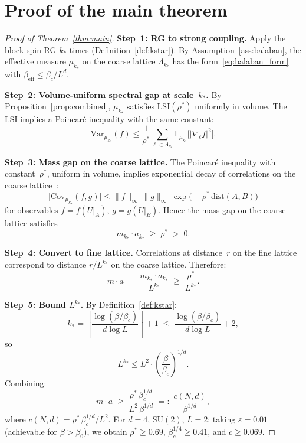 \documentclass[11pt]{article}
\theoremstyle{definition}
\theoremstyle{remark}
\newcommand{\SU}{\mathrm{SU}}
\newcommand{\Var}{\mathrm{Var}}
\newcommand{\LSI}{\mathrm{LSI}}
\newcommand{\dist}{\mathrm{dist}}
\begin{document}
\section{Proof of the main theorem}\label{sec:proof}

\begin{proof}[Proof of Theorem~\ref{thm:main}]
\textbf{Step~1: RG to strong coupling.}
Apply the block-spin RG $k_*$ times (Definition~\ref{def:kstar}).  
By Assumption~\ref{ass:balaban}, the effective measure $\mu_{k_*}$ 
on the coarse lattice $\Lambda_{k_*}$ has the 
form~\eqref{eq:balaban_form} with $\beta_{\mathrm{eff}} \leq \beta_c/L^d$.

\textbf{Step~2: Volume-uniform spectral gap at scale~$k_*$.}
By Proposition~\ref{prop:combined}, $\mu_{k_*}$ satisfies 
$\LSI(\rho^*)$ uniformly in volume.  The LSI implies a Poincar\'e 
inequality with the same constant:
\[
  \Var_{\mu_{k_*}}(f) \leq \frac{1}{\rho^*} 
  \sum_{\ell \in \Lambda_{k_*}} 
  \mathbb{E}_{\mu_{k_*}}\!\bigl[|\nabla_\ell f|^2\bigr].
\]

\textbf{Step~3: Mass gap on the coarse lattice.}
The Poincar\'e inequality with constant~$\rho^*$, uniform in 
volume, implies exponential decay of correlations on the coarse 
lattice~\cite[Prop.~4.2]{martinelli_lectures}:
\[
  \bigl|\mathrm{Cov}_{\mu_{k_*}}(f, g)\bigr| \leq 
  \|f\|_\infty\,\|g\|_\infty\;
  \exp\!\bigl(-\rho^*\,\dist(A,B)\bigr)
\]
for observables $f = f(U|_A)$, $g = g(U|_B)$.  Hence the mass 
gap on the coarse lattice satisfies
\[
  m_{k_*} \cdot a_{k_*} \;\geq\; \rho^* \;>\; 0.
\]

\textbf{Step~4: Convert to fine lattice.}
Correlations at distance~$r$ on the fine lattice correspond to 
distance $r/L^{k_*}$ on the coarse lattice.  Therefore:
\[
  m \cdot a \;=\; \frac{m_{k_*} \cdot a_{k_*}}{L^{k_*}} 
  \;\geq\; \frac{\rho^*}{L^{k_*}}.
\]

\textbf{Step~5: Bound $L^{k_*}$.}
By Definition~\ref{def:kstar}:
\[
  k_* = \left\lceil \frac{\log(\beta/\beta_c)}{d\log L} 
  \right\rceil + 1 
  \;\leq\; \frac{\log(\beta/\beta_c)}{d\log L} + 2,
\]
so
\[
  L^{k_*} \leq L^2 \cdot 
  \left(\frac{\beta}{\beta_c}\right)^{1/d}.
\]
Combining:
\[
  m \cdot a \;\geq\; 
  \frac{\rho^*\,\beta_c^{1/d}}{L^2\,\beta^{1/d}} 
  \;=:\; \frac{c(N,d)}{\beta^{1/d}},
\]
where $c(N,d) = \rho^*\,\beta_c^{1/d}/L^2$.  For $d = 4$, 
$\SU(2)$, $L = 2$: taking $\varepsilon = 0.01$ (achievable for 
$\beta > \beta_0$), we obtain $\rho^* \geq 0.69$, 
$\beta_c^{1/4} \geq 0.41$, and $c \geq 0.069$.
\end{proof}
\end{document}
